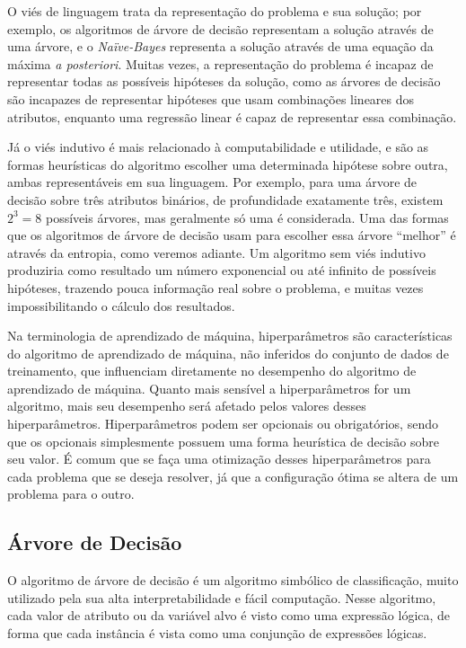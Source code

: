\documentclass{article}
\begin{document}
O viés de linguagem trata da representação do problema e sua solução;
por exemplo, os algoritmos de árvore de decisão representam a solução através de uma árvore,
e o {\it Naïve-Bayes} representa a solução através de uma equação da máxima {\it a posteriori}.
Muitas vezes, a representação do problema é incapaz de representar todas as possíveis hipóteses da solução,
como as árvores de decisão são incapazes de representar hipóteses que usam combinações lineares dos atributos,
enquanto uma regressão linear é capaz de representar essa combinação.

Já o viés indutivo é mais relacionado à computabilidade e utilidade,
e são as formas heurísticas do algoritmo escolher uma determinada hipótese sobre outra,
ambas representáveis em sua linguagem.
Por exemplo, para uma árvore de decisão sobre três atributos binários, de profundidade exatamente três,
existem $2^3 = 8$ possíveis árvores, mas geralmente só uma é considerada.
Uma das formas que os algoritmos de árvore de decisão usam para escolher essa árvore ``melhor''
é através da entropia, como veremos adiante.
Um algoritmo sem viés indutivo produziria como resultado um número exponencial ou até infinito
de possíveis hipóteses, trazendo pouca informação real sobre o problema,
e muitas vezes impossibilitando o cálculo dos resultados.

Na terminologia de aprendizado de máquina, hiperparâmetros são características do algoritmo de aprendizado de máquina,
não inferidos do conjunto de dados de treinamento, que influenciam diretamente no desempenho do algoritmo de aprendizado de máquina.
Quanto mais sensível a hiperparâmetros for um algoritmo, mais seu desempenho será afetado pelos valores desses hiperparâmetros.
Hiperparâmetros podem ser opcionais ou obrigatórios, sendo que os opcionais simplesmente possuem uma forma heurística
de decisão sobre seu valor.
É comum que se faça uma otimização desses hiperparâmetros para cada problema que se deseja resolver,
já que a configuração ótima se altera de um problema para o outro.


\subsection{Árvore de Decisão}

O algoritmo de árvore de decisão é um algoritmo simbólico de classificação,
muito utilizado pela sua alta interpretabilidade e fácil computação.
Nesse algoritmo, cada valor de atributo ou da variável alvo é visto como uma expressão lógica,
de forma que cada instância é vista como uma conjunção de expressões lógicas.
\end{document}
